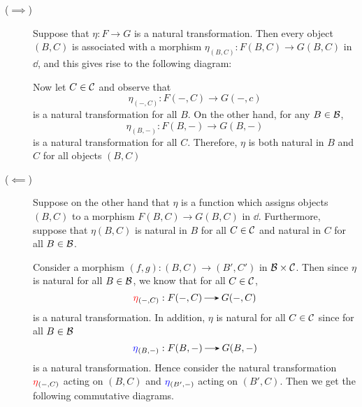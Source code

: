     \begin{prf}
        \begin{description}
            \item[($\bm{\implies}$)] Suppose that $\eta: F \to G$ is a
            natural transformation. Then every object $(B, C)$ is
            associated with a morphism $\eta_{(B, C)}: F(B, C) \to
            G(B, C)$ in $\dd$, and this gives rise to the following diagram:
            \begin{center}
                \hspace{2cm}
            \end{center}
            Now let $C \in \mathcal{C}$ and observe that 
            \[
                \eta_{(-, C)}: F(-, C) \to G(-,c)
            \]
            is a natural transformation for all $B$. On the other
            hand, for any $B \in \mathcal{B}$, 
            \[
                \eta_{(B, -)}: F(B, -) \to G(B, -)
            \]
            is a natural transformation for all $C$. Therefore, $\eta$
            is both natural in $B$ and $C$ for all objects $(B, C)$

            \item[($\bm{\impliedby}$)] Suppose on the other hand that
            $\eta$ is a function which assigns objects $(B, C)$ to a
            morphism $F(B, C) \to G(B, C)$ in $\dd$. Furthermore,
            suppose that $\eta(B, C)$ is natural in $B$ for all $C \in
            \mathcal{C}$ and natural in $C$ for all $B \in \mathcal{B}$. 

            Consider a morphism $(f, g) : (B, C) \to (B', C')$ in
            $\mathcal{B} \times \mathcal{C}$. Then since $\eta$ is natural for all $B
            \in \mathcal{B}$, we
            know that for all $C \in \mathcal{C}$, 
            \[
                \textcolor{red}{\eta}_{(-, C)} : F(-, C) \to G(-,C)  
            \]
            is a natural transformation. In addition, $\eta$ is
            natural for all $C \in \mathcal{C}$ since for all $B \in \mathcal{B}$ 
            \[
                \textcolor{blue}{\eta}_{(B, -)} : F(B, -) \to G(B, -)
            \]  
            is a natural transformation. Hence consider the natural
            transformation $\textcolor{red}{\eta}_{(-, C)}$ acting on
            $(B, C)$ and
            $\textcolor{blue}{\eta}_{(B', -)}$ acting on $(B', C)$.
            Then we get the following commutative diagrams.


\end{description}
\end{prf}

